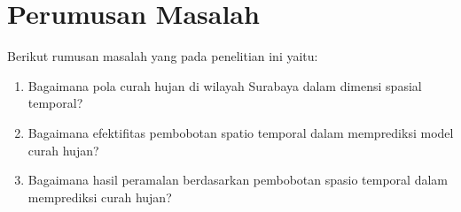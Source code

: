 \section{Perumusan Masalah}
Berikut rumusan masalah yang pada penelitian ini yaitu:
\begin{enumerate}
    \item Bagaimana pola curah hujan di wilayah Surabaya dalam dimensi spasial temporal?
    \item Bagaimana efektifitas pembobotan  spatio temporal dalam memprediksi model curah hujan?
    \item Bagaimana hasil peramalan berdasarkan pembobotan spasio temporal dalam memprediksi curah hujan?
\end{enumerate}